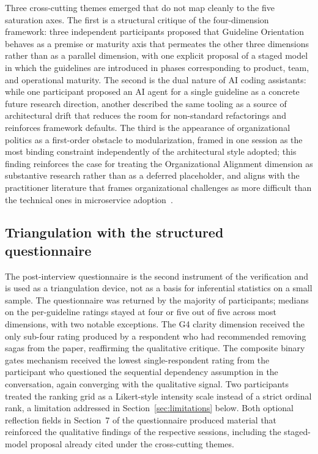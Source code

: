 Three cross-cutting themes emerged that do not map cleanly to the five saturation axes. The first is a structural critique of the four-dimension framework: three independent participants proposed that Guideline Orientation behaves as a premise or maturity axis that permeates the other three dimensions rather than as a parallel dimension, with one explicit proposal of a staged model in which the guidelines are introduced in phases corresponding to product, team, and operational maturity. The second is the dual nature of AI coding assistants: while one participant proposed an AI agent for a single guideline as a concrete future research direction, another described the same tooling as a source of architectural drift that reduces the room for non-standard refactorings and reinforces framework defaults. The third is the appearance of organizational politics as a first-order obstacle to modularization, framed in one session as the most binding constraint independently of the architectural style adopted; this finding reinforces the case for treating the Organizational Alignment dimension as substantive research rather than as a deferred placeholder, and aligns with the practitioner literature that frames organizational challenges as more difficult than the technical ones in microservice adoption~\cite{vitharana2024challenges}.

\subsection*{Triangulation with the structured questionnaire}

The post-interview questionnaire is the second instrument of the verification and is used as a triangulation device, not as a basis for inferential statistics on a small sample. The questionnaire was returned by the majority of participants; medians on the per-guideline ratings stayed at four or five out of five across most dimensions, with two notable exceptions. The G4 clarity dimension received the only sub-four rating produced by a respondent who had recommended removing sagas from the paper, reaffirming the qualitative critique. The composite binary gates mechanism received the lowest single-respondent rating from the participant who questioned the sequential dependency assumption in the conversation, again converging with the qualitative signal. Two participants treated the ranking grid as a Likert-style intensity scale instead of a strict ordinal rank, a limitation addressed in Section~\ref{sec:limitations} below. Both optional reflection fields in Section~7 of the questionnaire produced material that reinforced the qualitative findings of the respective sessions, including the staged-model proposal already cited under the cross-cutting themes.

